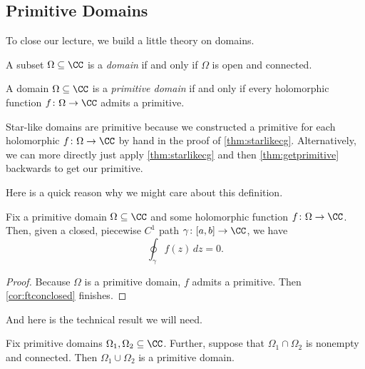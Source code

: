 \subsection{Primitive Domains}
To close our lecture, we build a little theory on domains.
\begin{definition}[Domain]
	A subset $\Omega\subseteq\CC$ is a \textit{domain} if and only if $\Omega$ is open and connected.
\end{definition}
\begin{definition}
	A domain $\Omega\subseteq\CC$ is a \textit{primitive domain} if and only if every holomorphic function $f\colon \Omega\to\CC$ admits a primitive.
\end{definition}
\begin{example}
	Star-like domains are primitive because we constructed a primitive for each holomorphic $f\colon \Omega\to\CC$ by hand in the proof of \autoref{thm:starlikecg}. Alternatively, we can more directly just apply \autoref{thm:starlikecg} and then \autoref{thm:getprimitive} backwards to get our primitive.
\end{example}
Here is a quick reason why we might care about this definition.
\begin{lemma} \label{lem:primitivepaths}
	Fix a primitive domain $\Omega\subseteq\CC$ and some holomorphic function $f\colon \Omega\to\CC$. Then, given a closed, piecewise $C^1$ path $\gamma\colon [a,b]\to\CC$, we have
	\[\oint_\gamma f(z)\,dz=0.\]
\end{lemma}
\begin{proof}
	Because $\Omega$ is a primitive domain, $f$ admits a primitive. Then \autoref{cor:ftconclosed} finishes.
\end{proof}
And here is the technical result we will need.
\begin{lemma}
	Fix primitive domains $\Omega_1,\Omega_2\subseteq\CC$. Further, suppose that $\Omega_1\cap\Omega_2$ is nonempty and connected. Then $\Omega_1\cup\Omega_2$ is a primitive domain.
\end{lemma}
